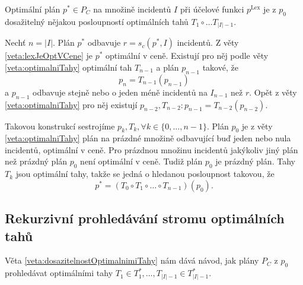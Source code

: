 \begin{veta}\label{veta:dosazitelnostOptimalnimiTahy}
  Optimální plán $p^* \in P_C$ na množině incidentů $I$ při účelové funkci $p^{\text{Lex}}$ je z $p_0$ dosažitelný nějakou posloupností optimálních tahů $T_1 \circ \dots T_{|I|-1}$.
\end{veta}
\begin{dukaz}
  Nechť $n = |I|$.
  Plán $p^*$ odbavuje $r = s_c(p^*, I)$ incidentů.
  Z věty \ref{veta:lexJeOptVCene} je $p^*$ optimální v ceně.
  Existují pro něj podle věty \ref{veta:optimalniTahy} optimální tah $T_{n-1}$ a plán $p_{n-1}$ takové, že
  \begin{equation*}
    p_n = T_{n-1}(p_{n-1})
  \end{equation*}
  a $p_{n-1}$ odbavuje stejně nebo o jeden méně incidentů na $I_{n-1}$ než $r$.
  Opět z věty \ref{veta:optimalniTahy} pro něj existují $p_{n-2}, T_{n-2} \colon p_{n-1} = T_{n-2}(p_{n-2})$.

  Takovou konstrukcí sestrojíme $p_{k}, T_{k}, \forall k \in \{ 0, \dots, n-1 \}$. 
  Plán $p_0$ je z věty \ref{veta:optimalniTahy} plán na prázdné množině odbavující buď jeden nebo nula incidentů, optimální v ceně.
  Pro prázdnou množinu incidentů jakýkoliv jiný plán než prázdný plán $p_0$ není optimální v ceně.
  Tudiž plán $p_0$ je prázdný plán.
  Tahy $T_k$ jsou optimální tahy, takže se jedná o hledanou posloupnost takovou, že
  \begin{equation*}
    p^* = (T_0 \circ T_1 \circ \dots \circ T_{n-1})(p_0).
  \end{equation*}
\end{dukaz}

\clearpage

\subsection{Rekurzivní prohledávání stromu optimálních tahů}

Věta \ref{veta:dosazitelnostOptimalnimiTahy} nám dává návod, jak plány $P_C$ z $p_0$ prohledávat optimálními tahy $T_1 \in T^*_1, \dots , T_{|I| - 1} \in T^*_{|I|-1}$.

